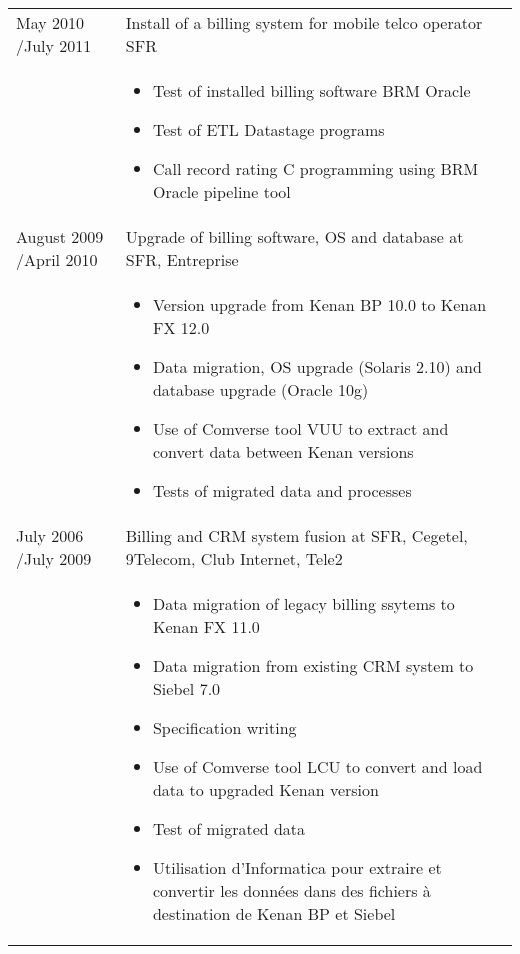 \documentclass[a4paper,11pt]{letter}
\begin{document}
\begin{tabular}{p{}p{}}
May 2010 \slash July 2011 & Install of a billing system for mobile telco operator SFR \\
	

& \begin{itemize}
\item Test of installed billing software BRM Oracle
\item Test of ETL Datastage programs
\item Call record rating C programming using BRM Oracle pipeline tool
\end{itemize} \\
	
August 2009 \slash April 2010 & Upgrade of billing software, OS and database at SFR, Entreprise\\

& \begin{itemize}
\item        Version upgrade from Kenan BP 10.0 to Kenan FX 12.0
\item        Data migration, OS upgrade (Solaris 2.10) and database upgrade (Oracle 10g)
\item        Use of Comverse tool VUU to extract and convert data between Kenan versions
\item        Tests of migrated data and processes
\end{itemize} \\


July 2006 \slash July 2009 & Billing and CRM system fusion at SFR, Cegetel, 9Telecom, Club Internet, Tele2 \\
	
& \begin{itemize}
\item         Data migration of legacy billing ssytems to Kenan FX 11.0
\item         Data migration from existing CRM system to Siebel 7.0
\item         Specification writing
\item         Use of Comverse tool LCU to convert and load data to upgraded Kenan version
\item         Test of migrated data
\item         Utilisation d'Informatica pour extraire et convertir les données dans des fichiers à destination de Kenan BP et Siebel
\end{itemize} \\

	


\end{tabular}
\end{document}
